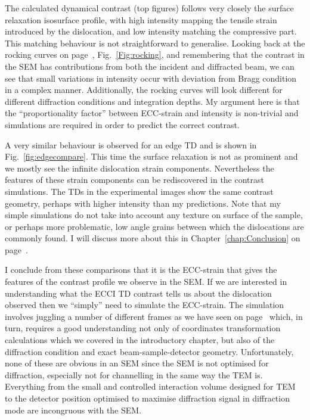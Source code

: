 The calculated dynamical contrast (top figures) follows very closely the surface relaxation isosurface profile, with high intensity mapping the tensile strain introduced by the dislocation, and low intensity matching the compressive part. This matching behaviour is not straightforward to generalise. Looking back at the rocking curves on page~\pageref{Fig:rocking}, Fig.~\ref{Fig:rocking}, and remembering that the contrast in the SEM has contributions from both the incident and diffracted beam, we can see that small variations in intensity occur with deviation from Bragg  condition in a complex manner. Additionally, the rocking curves will look different for different diffraction conditions and integration depths. My argument here is that the ``proportionality factor'' between ECC-strain and intensity is non-trivial and simulations are required in order to predict the correct contrast. 



A very similar behaviour is observed for an edge TD and is shown in Fig.~\ref{fig:edgecompare}. This time the surface relaxation is not as prominent and we mostly see the infinite dislocation strain components. Nevertheless the features of these strain components can be rediscovered in the contrast simulations. The TDs in the experimental images show the same contrast geometry, perhaps with higher intensity than my predictions. Note that my simple simulations do not take into account any texture on surface of the sample, or perhaps more problematic, low angle grains between which the dislocations are commonly found. I will discuss more about this in Chapter~\ref{chap:Conclusion} on page~\pageref{chap:Conclusion}.


I conclude from these comparisons that it is the ECC-strain that gives the features of the contrast profile we observe in the SEM. If we are interested in understanding what the ECCI TD contrast tells us about the dislocation observed then we ``simply'' need to simulate the ECC-strain. The simulation involves juggling a number of different frames as we have seen on page~\pageref{sec:coordinates} which, in turn, requires a good understanding not only of coordinates transformation calculations which we covered in the introductory chapter, but also of the diffraction condition and exact beam-sample-detector geometry. Unfortunately, none of these are obvious in an SEM since the SEM is not optimised for diffraction, especially not for channelling in the same way the TEM is. Everything from the small and controlled interaction volume designed for TEM to the detector position optimised to maximise diffraction signal in diffraction mode are incongruous with the SEM. 
 





